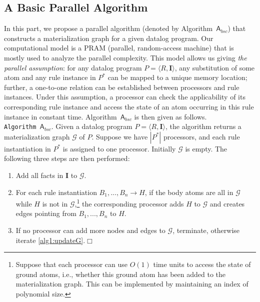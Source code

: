 \documentclass[final,1p,times]{elsarticle}
\begin{document}
\subsection{A Basic Parallel Algorithm}

In this part, we propose a parallel algorithm
(denoted by Algorithm~$\mathsf{A}_{bsc}$) that constructs a materialization graph for a given datalog program.
Our computational model is a PRAM (parallel, random-access machine) that is mostly used to analyze the parallel
complexity. This model allows us giving \emph{the parallel assumption}: 
for any datalog program $P=\langle R, \textbf{I}\rangle$,
any substitution of some atom and any rule instance in $P^*$ can be mapped to a unique memory
location; further, a one-to-one relation can be established between processors and rule instances.
Under this assumption, a processor can check the applicability of its corresponding
rule instance and access the state of an atom occurring in this rule instance in constant time.
Algorithm~$\mathsf{A}_{bsc}$ is then given as follows.\\


\noindent\texttt{Algorithm~$\mathsf{A}_{bsc}$}. Given a datalog program $P=\langle R, \textbf{I}\rangle$,
the algorithm returns a materialization graph $\mathcal{G}$ of $P$.
Suppose we have $|P^*|$ processors, and each rule instantiation in $P^*$ is
assigned to one processor.
Initially $\mathcal{G}$ is empty. The following three steps are then performed:
\begin{enumerate}[leftmargin=8ex,label=(\textit{Step \arabic*}),ref=Step~\arabic*]
\item Add all facts in $\textbf{I}$ to $\mathcal{G}$.\label{alg1:addFacts}
\item For each rule instantiation $B_1,...,B_n\rightarrow H$, if the body atoms are all
    in $\mathcal{G}$ while $H$ is not in $\mathcal{G}$,\footnote{Suppose that each processor
    can use $O(1)$ time units to access the state of ground atoms, i.e., whether this ground
    atom has been added to the materialization graph. This can be implemented by maintaining an
    index of polynomial size.}
    the corresponding processor adds $H$ to $\mathcal{G}$ and creates edges pointing
    from $B_1,...,B_n$ to $H$.\label{alg1:updateG}
\item If no processor can add more nodes and edges to $\mathcal{G}$, terminate, otherwise iterate \ref{alg1:updateG}.\label{alg1:halt}\hfill$\Box$
\end{enumerate}
\end{document}
